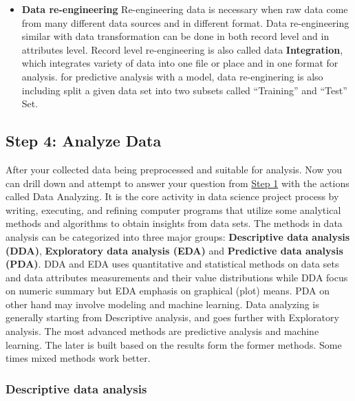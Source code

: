 \documentclass[
]{book}
\begin{document}
\begin{itemize}
\item
  \textbf{Data re-engineering}
  Re-engineering data is necessary when raw data come from many different data sources and in different format. Data re-engineering similar with data transformation can be done in both record level and in attributes level. Record level re-engineering is also called data \textbf{Integration}, which integrates variety of data into one file or place and in one format for analysis. for predictive analysis with a model, data re-enginering is also including split a given data set into two subsets called ``Training'' and ``Test'' Set.
\end{itemize}

\hypertarget{step-4-analyze-data}{%
\subsection*{Step 4: Analyze Data}\label{step-4-analyze-data}}


After your collected data being preprocessed and suitable for analysis. Now you can drill down and attempt to answer your question from \protect\hyperlink{step1}{Step 1} with the actions called Data Analyzing. It is the core activity in data science project process by writing, executing, and refining computer programs that utilize some analytical methods and algorithms to obtain insights from data sets. The methods in data analysis can be categorized into three major groups: \textbf{Descriptive data analysis (DDA)}, \textbf{Exploratory data analysis (EDA)} and \textbf{Predictive data analysis (PDA)}. DDA and EDA uses quantitative and statistical methods on data sets and data attributes measurements and their value distributions while DDA focus on numeric summary but EDA emphasis on graphical (plot) means. PDA on other hand may involve modeling and machine learning. Data analyzing is generally starting from Descriptive analysis, and goes further with Exploratory analysis. The most advanced methods are predictive analysis and machine learning. The later is built based on the results form the former methods. Some times mixed methods work better.

\hypertarget{descriptive-data-analysis}{%
\subsubsection*{\texorpdfstring{\textbf{Descriptive data analysis}}{Descriptive data analysis}}\label{descriptive-data-analysis}}
\end{document}

